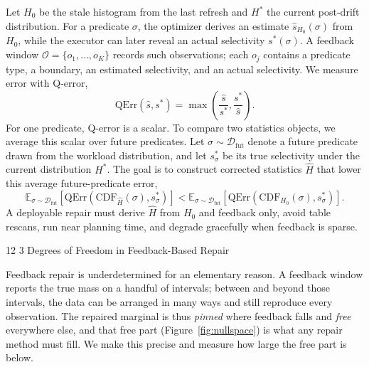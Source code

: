 \documentclass[preprint,12pt]{elsarticle}
\makeatletter
\renewcommand\subsection{\@startsection{subsection}{2}{\z@}%
           {12\p@ \@plus 6\p@ \@minus 3\p@}%
           {3\p@ \@plus 6\p@ \@minus 3\p@}%
           {\normalfont\normalsize\bfseries}}
\makeatother
\begin{document}
Let $H_0$ be the stale histogram from the last refresh and $H^\ast$ the current
post-drift distribution. For a predicate $\sigma$, the optimizer derives an estimate
$\hat{s}_{H_0}(\sigma)$ from $H_0$, while the executor can later reveal an actual
selectivity $s^\ast(\sigma)$. A feedback window
$\mathcal{O}=\{o_1,\ldots,o_K\}$ records such observations; each $o_j$ contains a
predicate type, a boundary, an estimated selectivity, and an actual selectivity. We
measure error with Q-error,
\begin{equation}
  \mathrm{QErr}(\hat{s},s^\ast) =
  \max\!\left(\frac{\hat{s}}{s^\ast}, \frac{s^\ast}{\hat{s}}\right).
  \label{eq:qerr}
\end{equation}
For one predicate, Q-error is a scalar. To compare two statistics objects, we average
this scalar over future predicates. Let $\sigma\sim\mathcal{D}_{\mathrm{fut}}$ denote a
future predicate drawn from the workload distribution, and let $s^\ast_{\sigma}$ be its
true selectivity under the current distribution $H^\ast$. The goal is to construct
corrected statistics $\hat{H}$ that lower this average future-predicate error,
\[
  \mathbb{E}_{\sigma\sim\mathcal{D}_{\mathrm{fut}}}\!\left[
    \mathrm{QErr}\!\left(\mathrm{CDF}_{\hat{H}}(\sigma),s^\ast_{\sigma}\right)
  \right]
  <
  \mathbb{E}_{\sigma\sim\mathcal{D}_{\mathrm{fut}}}\!\left[
    \mathrm{QErr}\!\left(\mathrm{CDF}_{H_0}(\sigma),s^\ast_{\sigma}\right)
  \right].
\]
A deployable repair must derive $\hat{H}$ from $H_0$ and feedback only, avoid table
rescans, run near planning time, and degrade gracefully when feedback is sparse.

\subsection{Degrees of Freedom in Feedback-Based Repair}
\label{sec:problem}

Feedback repair is underdetermined for an elementary reason. A feedback window reports the
true mass on a handful of intervals; between and beyond those intervals, the data can be
arranged in many ways and still reproduce every observation. The repaired marginal is thus
\emph{pinned} where feedback falls and \emph{free} everywhere else, and that free
part (Figure~\ref{fig:nullspace}) is what any repair method must fill. We make this precise
and measure how large the free part is below.
\end{document}
